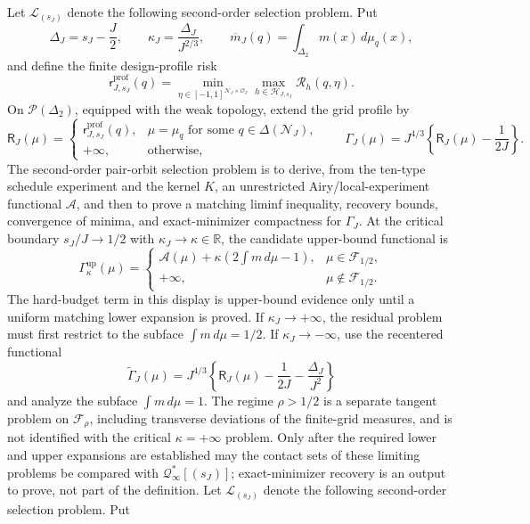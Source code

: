Let \(\mathcal L_{(s_J)}\) denote the following second-order selection problem. Put
\[
 \Delta_J=s_J-\frac J2,
 \qquad
 \kappa_J=\frac{\Delta_J}{J^{2/3}},
 \qquad
 \overline m_J(q)=\int_{\Delta_2}m(x)\,d\mu_q(x),
\]
and define the finite design-profile risk
\[
 \mathsf r^{\mathrm{prof}}_{J,s_J}(q)
 =\min_{\eta\in[-1,1]^{\mathcal N_J\times\mathcal O_J}}
   \max_{h\in\mathcal H_{J,s_J}}\mathcal R_h(q,\eta).
\]
On \(\mathcal P(\Delta_2)\), equipped with the weak topology, extend the grid profile by
\[
 \mathsf R_J(\mu)=
 \begin{cases}
 \mathsf r^{\mathrm{prof}}_{J,s_J}(q),&\mu=\mu_q\text{ for some }q\in\Delta(\mathcal N_J),\\
 +\infty,&\text{otherwise},
 \end{cases}
 \qquad
 \Gamma_J(\mu)=J^{4/3}\left\{\mathsf R_J(\mu)-\frac1{2J}\right\}.
\]
The second-order pair-orbit selection problem is to derive, from the ten-type schedule experiment and the kernel \(K\), an unrestricted Airy/local-experiment functional \(\mathcal A\), and then to prove a matching liminf inequality, recovery bounds, convergence of minima, and exact-minimizer compactness for \(\Gamma_J\). At the critical boundary \(s_J/J\to1/2\) with \(\kappa_J\to\kappa\in\mathbb R\), the candidate upper-bound functional is
\[
 \Gamma^{\mathrm{up}}_\kappa(\mu)
 =
 \begin{cases}
 \mathcal A(\mu)+\kappa\left(2\displaystyle\int m\,d\mu-1\right),
     &\mu\in\mathcal F_{1/2},\\
 +\infty,&\mu\notin\mathcal F_{1/2}.
 \end{cases}
\]
The hard-budget term in this display is upper-bound evidence only until a uniform matching lower expansion is proved. If \(\kappa_J\to+\infty\), the residual problem must first restrict to the subface \(\int m\,d\mu=1/2\). If \(\kappa_J\to-\infty\), use the recentered functional
\[
 \widetilde\Gamma_J(\mu)
 =J^{4/3}\left\{\mathsf R_J(\mu)-\frac1{2J}-\frac{\Delta_J}{J^2}\right\}
\]
and analyze the subface \(\int m\,d\mu=1\). The regime \(\rho>1/2\) is a separate tangent problem on \(\mathcal F_\rho\), including transverse deviations of the finite-grid measures, and is not identified with the critical \(\kappa=+\infty\) problem. Only after the required lower and upper expansions are established may the contact sets of these limiting problems be compared with \(\mathcal Q^*_{\infty}[(s_J)]\); exact-minimizer recovery is an output to prove, not part of the definition.
Let \(\mathcal L_{(s_J)}\) denote the following second-order selection problem. Put
